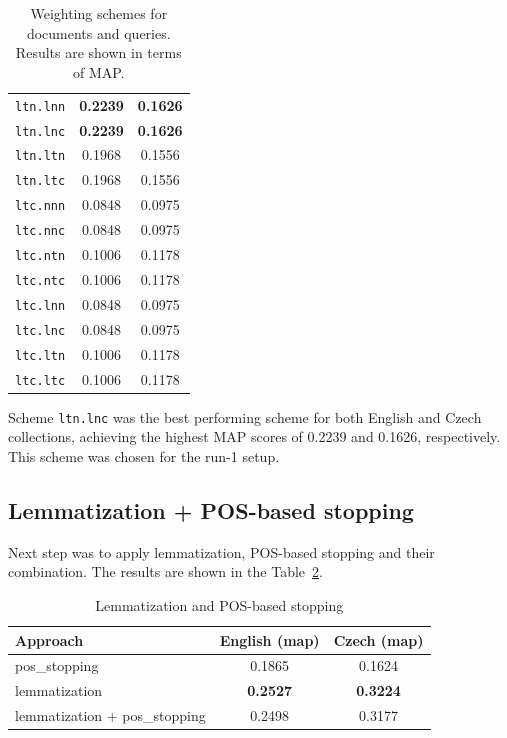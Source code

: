 \documentclass[a4paper, 12pt]{article}
\begin{document}
\begin{table}[H]
\begin{tabular}[t]{p{3cm}cc}
        \texttt{ltn.lnn} & \textbf{0.2239} & \textbf{0.1626} \\
        \texttt{ltn.lnc} & \textbf{0.2239} & \textbf{0.1626} \\
        \texttt{ltn.ltn} & 0.1968          & 0.1556 \\
        \texttt{ltn.ltc} & 0.1968          & 0.1556 \\
        \texttt{ltc.nnn} & 0.0848          & 0.0975 \\
        \texttt{ltc.nnc} & 0.0848          & 0.0975 \\
        \texttt{ltc.ntn} & 0.1006          & 0.1178 \\
        \texttt{ltc.ntc} & 0.1006          & 0.1178 \\
        \texttt{ltc.lnn} & 0.0848          & 0.0975 \\
        \texttt{ltc.lnc} & 0.0848          & 0.0975 \\
        \texttt{ltc.ltn} & 0.1006          & 0.1178 \\
        \texttt{ltc.ltc} & 0.1006          & 0.1178 \\
        \hline
    \end{tabular}
    
    \caption{Weighting schemes for documents and queries. Results are shown in terms of MAP.}
    \label{tab:weighting_schemes}
\end{table}

\FloatBarrier

Scheme \texttt{ltn.lnc} was the best performing scheme for both English and Czech collections, achieving the highest MAP scores of 0.2239 and 0.1626, respectively.
This scheme was chosen for the run-1 setup.

\newpage

\subsection{Lemmatization + POS-based stopping}

Next step was to apply lemmatization, POS-based stopping and their combination.
The results are shown in the Table~\ref{tab:lemmatization_pos_stopping}.

\begin{table}[h]
    \centering
    \begin{tabular}[t]{lcc} 
        \hline
        \textbf{Approach} & \textbf{English} (map) & \textbf{Czech} (map) \\ 
        \hline
         pos\_stopping & 0.1865 & 0.1624 \\
         lemmatization & \textbf{0.2527} & \textbf{0.3224} \\
         lemmatization + pos\_stopping & 0.2498 & 0.3177 \\
        \hline
    \end{tabular}
    \caption{Lemmatization and POS-based stopping}
    \label{tab:lemmatization_pos_stopping}
\end{table}
\end{document}
